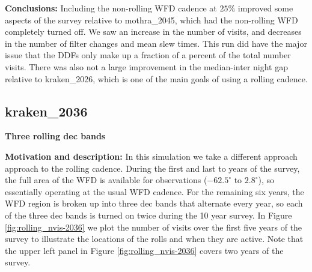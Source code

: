 \documentclass[DM,authoryear,toc]{lsstdoc}
\begin{document}
\textbf{Conclusions:} Including the non-rolling WFD cadence at $25\%$ improved some aspects of the survey
relative to mothra\_2045, which had the non-rolling WFD completely turned off. We saw an increase in the number of visits,
and decreases in the number of filter changes and mean slew times. This run did have the major issue that the DDFs only
make up a fraction of a percent of the total number visits. There was also not a large improvement in the median-inter night
gap relative to kraken\_2026, which is one of the main goals of using a rolling cadence.

\subsection{kraken\_2036} \label{kraken2036}

\textbf{Three rolling dec bands}

\textbf{Motivation and description:} In this simulation we take a different approach approach to the rolling cadence. During
the first and last to years of the survey, the full area of the WFD is available for observations ($-62.5^{\circ}$ to $2.8^{\circ}$), so essentially
operating at the usual WFD cadence. For the remaining six years, the WFD region is broken up into three dec bands that alternate every year,
so each of the three dec bands is turned on twice during the 10 year survey. In Figure \autoref{fig:rolling_nvis-2036}
we plot the number of visits over the first five years of the survey to illustrate the locations of the rolls and when they are active. Note that
the upper left panel in Figure \autoref{fig:rolling_nvis-2036} covers two years of the survey.
\end{document}
